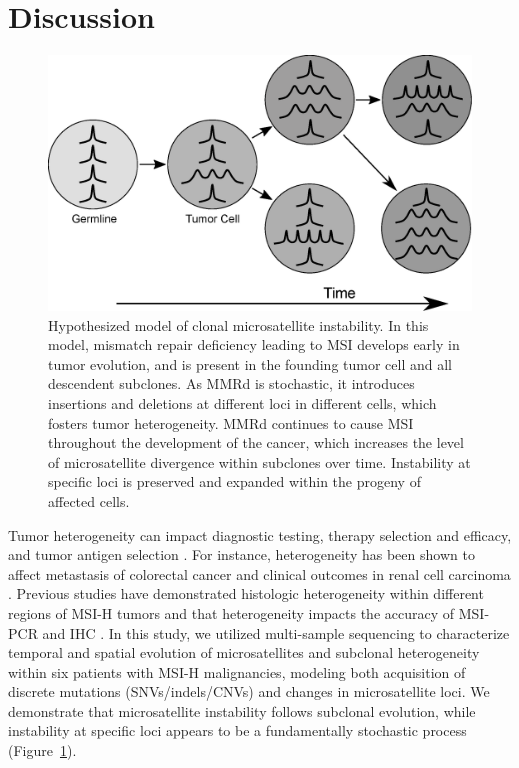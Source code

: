 \section{Discussion}
\begin{figure}[ht]
	\begin{center}
		\includegraphics[width=0.7\linewidth]{images/msiclones/subclonal_ms_model}
	\end{center}
	\vspace{-0.4cm}
    \caption[Hypothesized model of clonal microsatellite instability.]{Hypothesized model of clonal microsatellite instability. In this model, mismatch repair deficiency leading to MSI develops early in tumor evolution, and is present in the founding tumor cell and all descendent subclones. As MMRd is stochastic, it introduces insertions and deletions at different loci in different cells, which fosters tumor heterogeneity. MMRd continues to cause MSI throughout the development of the cancer, which increases the level of microsatellite divergence within subclones over time. Instability at specific loci is preserved and expanded within the progeny of affected cells.}
    \label{fig:msiclones:clonal_ms_model}
\end{figure}

Tumor heterogeneity can impact diagnostic testing, therapy selection and efficacy, and tumor antigen selection \cite{mcgranahan2017}. For instance, heterogeneity has been shown to affect metastasis of colorectal cancer \cite{joung2017} and clinical outcomes in renal cell carcinoma \cite{huang2019}. Previous studies have demonstrated histologic heterogeneity within different regions of MSI-H tumors \cite{desmedt2015} and that heterogeneity impacts the accuracy of MSI-PCR and IHC \cite{chapusot2002,choi2014}. In this study, we utilized multi-sample sequencing to characterize temporal and spatial evolution of microsatellites and subclonal heterogeneity within six patients with MSI-H malignancies, modeling both acquisition of discrete mutations (SNVs\slash{}indels\slash{}CNVs) and changes in microsatellite loci. We demonstrate that microsatellite instability follows subclonal evolution, while instability at specific loci appears to be a fundamentally stochastic process (Figure~\ref{fig:msiclones:clonal_ms_model}).

